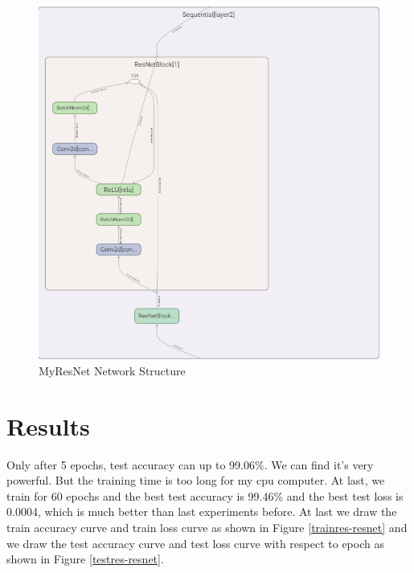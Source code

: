 \documentclass{elegantbook}
\begin{document}
\begin{figure}[!h]
\begin{minipage}[t]{0.335\textwidth}
	\end{minipage}
	\begin{minipage}[t]{0.65\textwidth}
		\centering
		\includegraphics[width=\textwidth]{../results/myresnet2}
	\end{minipage}
	\caption{\label{resnet}MyResNet Network Structure}
\end{figure}

\section{Results}
Only after 5 epochs, test accuracy can up to 99.06\%. We can find it's very powerful. But the training time is too long for my cpu computer. At last, we train for 60 epochs and the best test accuracy is 99.46\% and the best test loss is 0.0004, which is much better than last experiments before. At last we draw the train accuracy curve and train loss curve as shown in Figure \ref{trainres-resnet} and we draw the test accuracy curve and test loss curve with respect to epoch as shown in Figure \ref{testres-resnet}.
\end{document}
